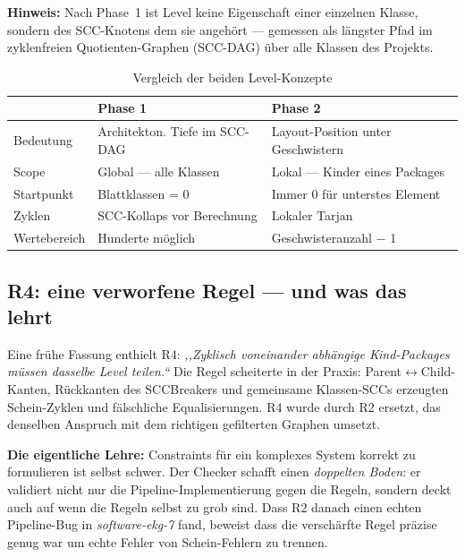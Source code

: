 \documentclass[a4paper,twoside]{article}
\begin{document}
\noindent\textbf{Hinweis:} Nach Phase~1 ist Level keine Eigenschaft einer einzelnen
Klasse, sondern des SCC-Knotens dem sie angeh\"{o}rt --- gemessen als l\"{a}ngster Pfad
im zyklenfreien Quotienten-Graphen (SCC-DAG) \"{u}ber alle Klassen des Projekts.

\begin{table}[h]
\small
\centering
\begin{tabular}{lll}
\hline
& \textbf{Phase 1} & \textbf{Phase 2} \\
\hline
Bedeutung    & Architekton. Tiefe im SCC-DAG & Layout-Position unter Geschwistern \\
Scope        & Global --- alle Klassen       & Lokal --- Kinder eines Packages \\
Startpunkt   & Blattklassen = 0              & Immer 0 f\"{u}r unterstes Element \\
Zyklen       & SCC-Kollaps vor Berechnung    & Lokaler Tarjan \\
Wertebereich & Hunderte m\"{o}glich           & Geschwisteranzahl $-$ 1 \\
\hline
\end{tabular}
\caption{Vergleich der beiden Level-Konzepte}
\end{table}

\subsection*{R4: eine verworfene Regel --- und was das lehrt}

Eine fr\"{u}he Fassung enthielt R4: \emph{,,Zyklisch voneinander abh\"{a}ngige
Kind-Packages m\"{u}ssen dasselbe Level teilen.``} Die Regel scheiterte in der Praxis:
Parent$\leftrightarrow$Child-Kanten, R\"{u}ckkanten des SCCBreakers und gemeinsame
Klassen-SCCs erzeugten Schein-Zyklen und f\"{a}lschliche Equalisierungen.
R4 wurde durch R2 ersetzt, das denselben Anspruch mit dem richtigen gefilterten
Graphen umsetzt.

\textbf{Die eigentliche Lehre:} Constraints f\"{u}r ein komplexes System korrekt zu
formulieren ist selbst schwer. Der Checker schafft einen \emph{doppelten Boden}:
er validiert nicht nur die Pipeline-Implementierung gegen die Regeln, sondern
deckt auch auf wenn die Regeln selbst zu grob sind. Dass R2 danach einen echten
Pipeline-Bug in \emph{software-ekg-7} fand, beweist dass die verschärfte Regel
pr\"{a}zise genug war um echte Fehler von Schein-Fehlern zu trennen.
\end{document}
